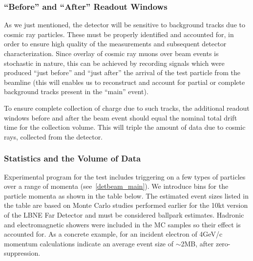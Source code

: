 


\subsubsection{``Before'' and ``After'' Readout Windows}
\label{readout_windows}


As we just mentioned, the detector will be sensitive to background tracks due to cosmic ray particles.  These must be properly identified
and accounted for, in order to ensure high quality of the measurements and subsequent detector characterization. Since overlay of cosmic
ray muons over beam events is stochastic in nature, this can be achieved by recording signals which were produced ``just before'' and ``just after''
the arrival of the test particle from the beamline (this will enables us to reconstruct and account for partial or complete background
tracks present in the ``main'' event).

To ensure complete collection of charge due to such tracks, the additional readout windows before and after 
the beam event should equal the nominal total drift time for the collection volume. This will triple the amount of
data due to cosmic rays, collected from the detector.


\subsubsection{Statistics and the Volume of Data}
\label{bin_table}
Experimental program for the test includes triggering on a few types of particles over a range of momenta (see~\ref{detbeam_main}). We introduce
bins for the particle momenta as shown in the table below. The estimated event sizes listed in the table are based on
Monte Carlo studies performed earlier for the 10kt version of the LBNE Far Detector and must be considered ballpark estimates. Hadronic and electromagnetic
showers were included in the MC samples so their effect is accounted for. As a concrete example, for an incident electron of 4GeV/c momentum
calculations indicate an average event size of $\sim$2MB, after zero-suppression.


